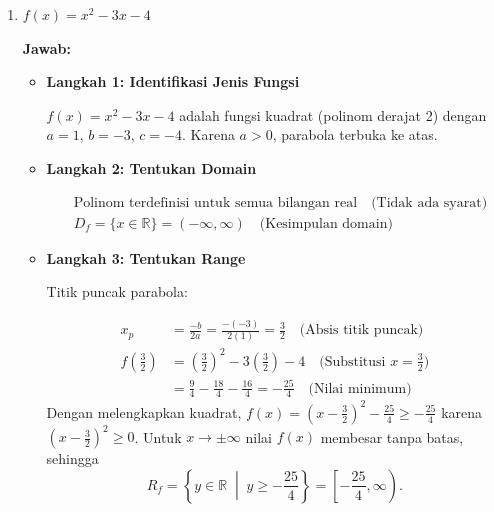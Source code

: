 \documentclass[10pt,a4paper]{article}
\newcounter{eqblock}
\newcommand{\reseteq}{%
  \stepcounter{eqblock}%
  \setcounter{equation}{0}%
  \renewcommand{\theHequation}{\arabic{eqblock}.\arabic{equation}}%
}
\begin{document}
\begin{enumerate}
\begin{enumerate}
\begin{itemize}
\begin{center}
\end{center}
Garis hijau pada sumbu-$x$ menunjukkan domain $(-\infty, 9]$ dan garis merah pada sumbu-$y$ menunjukkan range $[0, \infty)$.
\end{itemize}

\item $f(x) = x^2 - 3x - 4$

\textbf{Jawab:}
\begin{itemize}
\item \textbf{Langkah 1: Identifikasi Jenis Fungsi}

$f(x) = x^2 - 3x - 4$ adalah fungsi kuadrat (polinom derajat 2) dengan $a = 1$, $b = -3$, $c = -4$. Karena $a > 0$, parabola terbuka ke atas.

\item \textbf{Langkah 2: Tentukan Domain}

\reseteq
\begin{align}
&\text{Polinom terdefinisi untuk semua bilangan real} \quad \text{(Tidak ada syarat)} \\
&D_f = \{x \in \mathbb{R}\} = (-\infty, \infty) \quad \text{(Kesimpulan domain)}
\end{align}

\item \textbf{Langkah 3: Tentukan Range}

Titik puncak parabola:
\reseteq
\begin{align}
x_p &= \frac{-b}{2a} = \frac{-(-3)}{2(1)} = \frac{3}{2} \quad \text{(Absis titik puncak)} \\
f\left(\frac{3}{2}\right) &= \left(\frac{3}{2}\right)^2 - 3\left(\frac{3}{2}\right) - 4 \quad \text{(Substitusi $x = \tfrac{3}{2}$)} \\
&= \frac{9}{4} - \frac{18}{4} - \frac{16}{4} = -\frac{25}{4} \quad \text{(Nilai minimum)}
\end{align}
Dengan melengkapkan kuadrat, $f(x) = \left(x - \frac{3}{2}\right)^2 - \frac{25}{4} \geq -\frac{25}{4}$ karena $\left(x - \frac{3}{2}\right)^2 \geq 0$.
Untuk $x \to \pm\infty$ nilai $f(x)$ membesar tanpa batas, sehingga
\[
R_f = \left\{y \in \mathbb{R} \;\middle|\; y \geq -\frac{25}{4}\right\} = \left[-\frac{25}{4}, \infty\right).
\]


\end{itemize}
\end{enumerate}
\end{enumerate}
\end{document}

